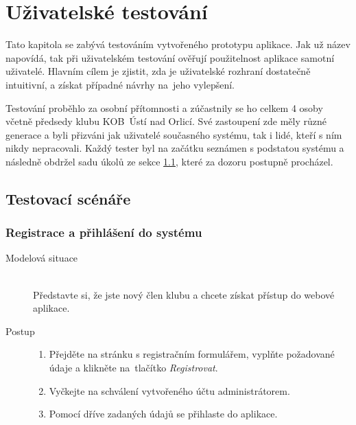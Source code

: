 \chapter{Uživatelské testování}
Tato kapitola se zabývá testováním vytvořeného prototypu aplikace. Jak už název napovídá, tak při uživatelském testování ověřují použitelnost aplikace samotní uživatelé. Hlavním cílem je zjistit, zda je uživatelské rozhraní dostatečně intuitivní, a získat případné návrhy na~jeho vylepšení.

Testování proběhlo za osobní přítomnosti a zúčastnily se ho celkem 4 osoby včetně předsedy klubu KOB~Ústí nad Orlicí. Své zastoupení zde měly různé generace a byli přizváni jak uživatelé současného systému, tak i lidé, kteří s ním nikdy nepracovali. Každý tester byl na začátku seznámen s podstatou systému a následně obdržel sadu úkolů ze sekce \ref{test-cases}, které za dozoru postupně procházel.

\section{Testovací scénáře}\label{test-cases}

\subsection{Registrace a přihlášení do systému}\label{test-case-1}
\begin{description}
    \item[Modelová situace] \hfill \\
        Představte si, že jste nový člen klubu a chcete získat přístup do webové aplikace.
    \item[Postup] \hfill
        \vspace{-2mm}
        \begin{enumerate}
            \item Přejděte na stránku s registračním formulářem, vyplňte požadované údaje a klikněte na~tlačítko \emph{Registrovat}.
            \item Vyčkejte na schválení vytvořeného účtu administrátorem.
            \item Pomocí dříve zadaných údajů se přihlaste do aplikace.
        \end{enumerate}
\end{description}

